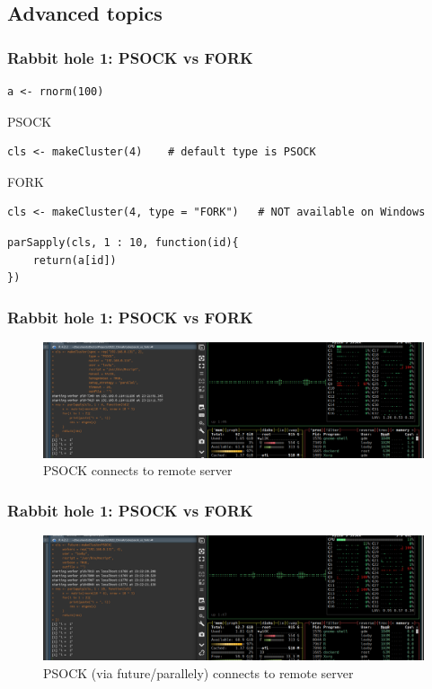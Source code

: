 \documentclass[aspectratio=169,xcolor={dvipsnames,table}]{beamer}
\begin{document}
\subsection{Advanced topics}

\begin{frame}[fragile]
  \frametitle{Rabbit hole 1: PSOCK vs FORK}
\begin{verbatim}
a <- rnorm(100)
\end{verbatim}
  \begin{block}{PSOCK}
\begin{verbatim}
cls <- makeCluster(4)    # default type is PSOCK
\end{verbatim}
  \end{block}
  \begin{block}{FORK}
\begin{verbatim}
cls <- makeCluster(4, type = "FORK")   # NOT available on Windows
\end{verbatim}
  \end{block}
\begin{verbatim}
parSapply(cls, 1 : 10, function(id){
    return(a[id])    
})
\end{verbatim}
\end{frame}

\begin{frame}
  \frametitle{Rabbit hole 1: PSOCK vs FORK}
  \begin{figure}[htbp]
    \centering
    \includegraphics[width = \textwidth]{psock_remote}
    \caption{PSOCK connects to remote server}
  \end{figure}
\end{frame}

\begin{frame}
  \frametitle{Rabbit hole 1: PSOCK vs FORK}
  \begin{figure}[htbp]
    \centering
    \includegraphics[width = \textwidth]{psock_remote_future}
    \caption{PSOCK (via future/parallely) connects to remote server}
  \end{figure}
\end{frame}
\end{document}
